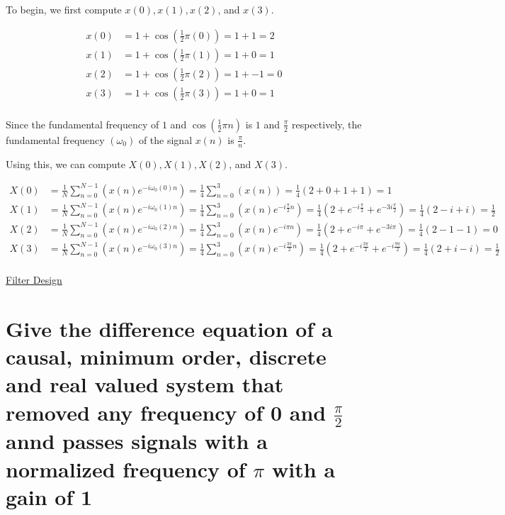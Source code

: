 \documentclass{article}
\begin{document}
To begin, we first compute $x(0), x(1), x(2)$, and $x(3)$.

\begin{align*}
	x(0) &= 1 + \cos{(\frac{1}{2}{\pi}(0))} = 1 + 1 = 2 \\
	x(1) &= 1 + \cos{(\frac{1}{2}{\pi}(1))} = 1 + 0 = 1 \\
	x(2) &= 1 + \cos{(\frac{1}{2}{\pi}(2))} = 1 + -1 = 0 \\
	x(3) &= 1 + \cos{(\frac{1}{2}{\pi}(3))} = 1 + 0 = 1 \\
\end{align*}

Since the fundamental frequency of $1$ and $\cos{(\frac{1}{2}{\pi}n)}$ is $1$ and $\frac{\pi}{2}$ respectively, the fundamental frequency $(\omega_0)$ of the signal $x(n)$ is $\frac{\pi}{n}$.

Using this, we can compute $X(0), X(1), X(2)$, and $X(3)$.

\begin{align*}
	X(0) &= \frac{1}{N}\sum_{n = 0}^{N - 1}(x(n)e^{-i{\omega_0}(0)n}) = \frac{1}{4}\sum_{n = 0}^{3}(x(n)) = \frac{1}{4}(2 + 0 + 1 + 1) = 1 \\
	X(1) &= \frac{1}{N}\sum_{n = 0}^{N - 1}(x(n)e^{-i{\omega_0}(1)n}) = \frac{1}{4}\sum_{n = 0}^{3}(x(n)e^{-i\frac{\pi}{2}n}) = \frac{1}{4}(2 + e^{-i\frac{\pi}{2}}+ e^{-3i{\frac{\pi}{2}}}) = \frac{1}{4}(2 - i + i) = \frac{1}{2} \\
	X(2) &= \frac{1}{N}\sum_{n = 0}^{N - 1}(x(n)e^{-i{\omega_0}(2)n}) = \frac{1}{4}\sum_{n = 0}^{3}(x(n)e^{-i{\pi}n}) = \frac{1}{4}(2 + e^{-i{\pi}}+ e^{-3i{\pi}}) = \frac{1}{4}(2 - 1 - 1 ) = 0 \\
	X(3) &= \frac{1}{N}\sum_{n = 0}^{N - 1}(x(n)e^{-i{\omega_0}(3)n}) = \frac{1}{4}\sum_{n = 0}^{3}(x(n)e^{-i\frac{3\pi}{2}n}) = \frac{1}{4}(2 + e^{-i\frac{3\pi}{2}}+ e^{-i{\frac{9\pi}{2}}}) = \frac{1}{4}(2 + i - i) = \frac{1}{2} \\
\end{align*}

\newpage

\begin{center}
	\Large{\underline{Filter Design}}
\end{center}

\section[Question ~\thesection]{Give the difference equation of a causal, minimum order, discrete and real valued system that removed any frequency of 0 and $\frac{\pi}{2}$ annd passes signals with a normalized frequency of $\pi$ with a gain of 1}
\end{document}
